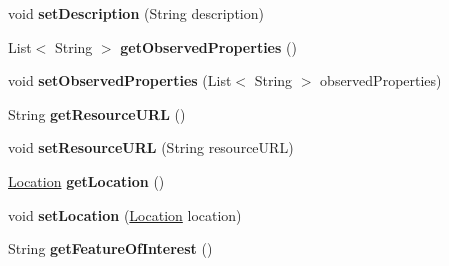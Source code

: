 \begin{DoxyCompactItemize}
\item 
void {\bfseries set\+Description} (String description)\hypertarget{classeu_1_1h2020_1_1symbiote_1_1model_1_1Resource_a19349909b51f43be943fcc3ebc078009}{}\label{classeu_1_1h2020_1_1symbiote_1_1model_1_1Resource_a19349909b51f43be943fcc3ebc078009}

\item 
List$<$ String $>$ {\bfseries get\+Observed\+Properties} ()\hypertarget{classeu_1_1h2020_1_1symbiote_1_1model_1_1Resource_a2aaf59e1be5b0c974a31e106adfa6c43}{}\label{classeu_1_1h2020_1_1symbiote_1_1model_1_1Resource_a2aaf59e1be5b0c974a31e106adfa6c43}

\item 
void {\bfseries set\+Observed\+Properties} (List$<$ String $>$ observed\+Properties)\hypertarget{classeu_1_1h2020_1_1symbiote_1_1model_1_1Resource_a826dbee60cf539ffbf1a088496ac7e11}{}\label{classeu_1_1h2020_1_1symbiote_1_1model_1_1Resource_a826dbee60cf539ffbf1a088496ac7e11}

\item 
String {\bfseries get\+Resource\+U\+RL} ()\hypertarget{classeu_1_1h2020_1_1symbiote_1_1model_1_1Resource_a4a0c05d9007f2216c55ddc32a44f467b}{}\label{classeu_1_1h2020_1_1symbiote_1_1model_1_1Resource_a4a0c05d9007f2216c55ddc32a44f467b}

\item 
void {\bfseries set\+Resource\+U\+RL} (String resource\+U\+RL)\hypertarget{classeu_1_1h2020_1_1symbiote_1_1model_1_1Resource_a27d7401a8087bf902fd575039d574d0c}{}\label{classeu_1_1h2020_1_1symbiote_1_1model_1_1Resource_a27d7401a8087bf902fd575039d574d0c}

\item 
\hyperlink{classeu_1_1h2020_1_1symbiote_1_1model_1_1Location}{Location} {\bfseries get\+Location} ()\hypertarget{classeu_1_1h2020_1_1symbiote_1_1model_1_1Resource_acfb7ead093f1ed692640c99daba8fc6c}{}\label{classeu_1_1h2020_1_1symbiote_1_1model_1_1Resource_acfb7ead093f1ed692640c99daba8fc6c}

\item 
void {\bfseries set\+Location} (\hyperlink{classeu_1_1h2020_1_1symbiote_1_1model_1_1Location}{Location} location)\hypertarget{classeu_1_1h2020_1_1symbiote_1_1model_1_1Resource_a14eba3bd0171783f32d6d4446768905d}{}\label{classeu_1_1h2020_1_1symbiote_1_1model_1_1Resource_a14eba3bd0171783f32d6d4446768905d}

\item 
String {\bfseries get\+Feature\+Of\+Interest} ()\hypertarget{classeu_1_1h2020_1_1symbiote_1_1model_1_1Resource_a1e5912a2e60f0d2dcda674f26ebe871b}{}\label{classeu_1_1h2020_1_1symbiote_1_1model_1_1Resource_a1e5912a2e60f0d2dcda674f26ebe871b}


\end{DoxyCompactItemize}
